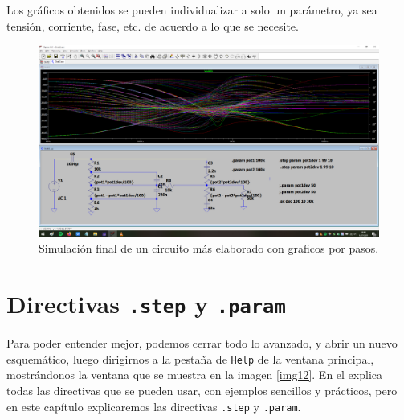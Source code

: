 \documentclass[a4paper]{article} %
\begin{document}
Los gráficos obtenidos se pueden individualizar a solo un parámetro, ya sea tensión, corriente, fase, etc. de acuerdo a lo que se necesite.

\begin{figure} %
	\centering %
	\includegraphics[scale=0.3]{IMAGENES/img11} %
	\caption{Simulación final de un circuito más elaborado con graficos por pasos.} %
	\label{img11} %
\end{figure} %


\section{Directivas \texttt{.step} y \texttt{.param}}

Para poder entender mejor, podemos cerrar todo lo avanzado, y abrir un nuevo esquemático, luego dirigirnos a la pestaña de \texttt{Help} de la ventana principal, mostrándonos la ventana que se muestra en la imagen \eqref{img12}. En el explica todas las directivas que se pueden usar, con ejemplos sencillos y prácticos, pero en este capítulo explicaremos las directivas \texttt{.step} y \texttt{.param}.
\end{document}
